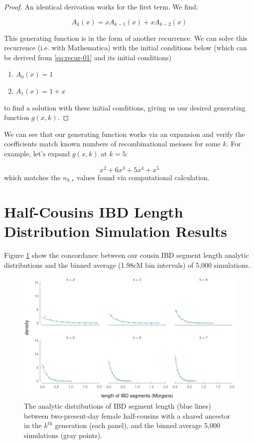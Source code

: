 \documentclass[11pt]{article}
\begin{document}
\begin{proof}
 An identical derivation works for the first term. We find:

 \begin{equation} \label{eq:rec-gen}
   A_k(x) = xA_{k-1}(x) + xA_{k-2}(x)
 \end{equation}

This generating function is in the form of another recurrence. We can solve
this recurrence (i.e. with Mathematica) with the initial conditions below
(which can be derived from \eqref{eq:recur-01} and its initial conditions)
%
\begin{enumerate}
  \item $ A_0(x) = 1 $
  \item $ A_1(x) = 1 + x $
\end{enumerate}
%
to find a solution with these initial conditions, giving us our desired
generating function $g(x,k)$.

\end{proof}

We can see that our generating function works via an expansion and verify
the coefficients match known numbers of recombinational meioses for some $k$.
For example, let's expand $g(x, k)$ at $k=5$:

\begin{equation*}
  x^2 + 6x^3 + 5x^4 + x^5
\end{equation*}
%
which matches the $n_{k,r}$ values found via computational calculation.

\section{Half-Cousins IBD Length Distribution Simulation Results}

Figure \ref{fig:half-cousin-x-length} show the concordance between our cousin
IBD segment length analytic distributions and the binned average (1.98cM bin
intervals) of 5,000 simulations.

\begin{figure}[!ht]
  \centering
  \includegraphics[width=\textwidth]{images/x-halfcousins-blocklens}

  \caption{The analytic distributions of IBD segment length (blue lines)
  between two-present-day female half-cousins with a shared ancestor in the
$k^\text{th}$ generation (each panel), and the binned average 5,000
simulations (gray points).}

\label{fig:half-cousin-x-length}

\end{figure}
\end{document}
